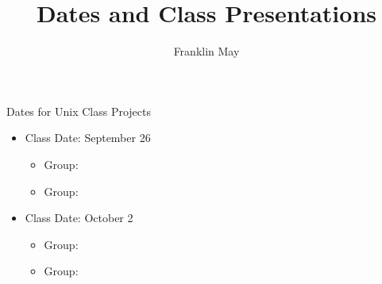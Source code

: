 \documentclass[12pt]{article}
\begin{document}
\author{Franklin May}
\title{Dates and Class Presentations}
\maketitle

Dates for Unix Class Projects
\begin{itemize}
\item Class Date: September 26
\begin{itemize}
\item Group:
\item Group:
\end{itemize}
\item Class Date: October 2
\begin{itemize}
\item Group:
\item Group:
\end{itemize}
\end{itemize}
\end{document}
